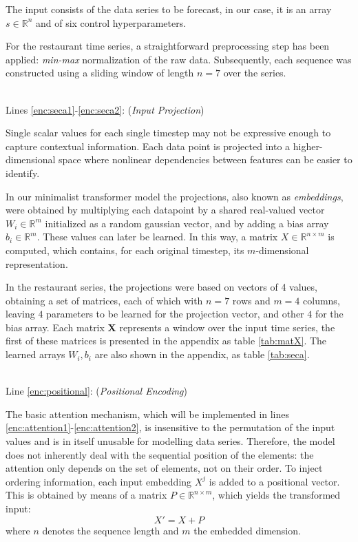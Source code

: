 \documentclass[algorithms,article,submit,pdftex,moreauthors]{Definitions/mdpi}
\begin{document}
The input consists of the data series to be forecast, in our case, it is an array $s \in \mathbb{R}^n$ and of six control hyperparameters.

For the restaurant time series, a straightforward preprocessing step has been applied: \textit{min-max} normalization of the raw data. Subsequently, each sequence was constructed using a sliding window of length $n = 7$ over the series.

~\\Lines \ref{enc:seca1}-\ref{enc:seca2}: (\textit{Input Projection})

Single scalar values for each single timestep may not be expressive enough to capture contextual information. Each data point is projected into a higher-dimensional space where nonlinear dependencies between features can be easier to identify. 

In our minimalist transformer model the projections, also known as {\em embeddings}, were obtained by multiplying each datapoint by a shared real-valued vector $W_i \in \mathbb{R}^m$ initialized as a random gaussian vector, and by adding a bias array $b_i \in \mathbb{R}^m$. These values can later be learned. In this way, a matrix $X \in \mathbb{R}^{n\times m}$ is computed, which contains, for each original timestep, its $m$-dimensional representation.

In the restaurant series, the projections were based on vectors of 4 values, obtaining a set of matrices, each of which with $n=7$ rows and $m=4$ columns, leaving $4$ parameters to be learned for the projection vector, and other $4$ for the bias array. Each matrix {\bf X} represents a window over the input time series, the first of these matrices is presented in the appendix as table \ref{tab:matX}. The learned arrays $W_i, b_i$ are also shown in the appendix, as table \ref{tab:seca}.

~\\Line \ref{enc:positional}: (\textit{Positional Encoding})

The basic attention mechanism, which will be implemented in lines \ref{enc:attention1}-\ref{enc:attention2}, is insensitive to the permutation of the input values \cite{VSPU17} and is in itself unusable for modelling data series. Therefore, the model does not inherently deal with the sequential position of the elements: the attention only depends on the set of elements, not on their order. To inject ordering information, each input embedding $X^j$ is added to a positional vector. 
This is obtained by means of a matrix $P \in \mathbb{R}^{n \times m}$, which yields the transformed input: 
\begin{equation}
    X' = X + P
\end{equation}
where $n$ denotes the sequence length and $m$ the embedded dimension.
\end{document}

